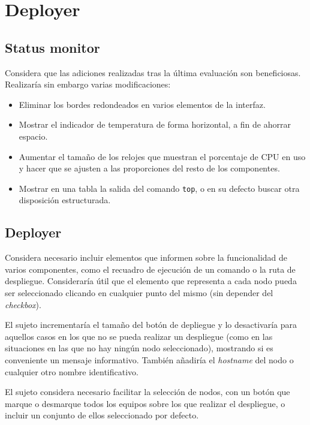 \section{Deployer}

\subsection{Status monitor}

Considera que las adiciones realizadas tras la última evaluación son beneficiosas. Realizaría sin embargo varias modificaciones:

\begin{itemize}
	\item Eliminar los bordes redondeados en varios elementos de la interfaz.
	\item Mostrar el indicador de temperatura de forma horizontal, a fin de ahorrar espacio.
	\item Aumentar el tamaño de los relojes que muestran el porcentaje de CPU en uso y hacer que se ajusten a las proporciones del resto de los componentes.
	\item Mostrar en una tabla la salida del comando \texttt{top}, o en su defecto buscar otra disposición estructurada.
\end{itemize}


\subsection{Deployer}

Considera necesario incluir elementos que informen sobre la funcionalidad de varios componentes, como el recuadro de ejecución de un comando o la ruta de despliegue. Consideraría útil que el elemento que representa a cada nodo pueda ser seleccionado clicando en cualquier punto del mismo (sin depender del \textit{checkbox}).

El sujeto incrementaría el tamaño del botón de depliegue y lo desactivaría para aquellos casos en los que no se pueda realizar un despliegue (como en las situaciones en las que no hay ningún nodo seleccionado), mostrando si es conveniente un mensaje informativo. También añadiría el \textit{hostname} del nodo o cualquier otro nombre identificativo.

El sujeto considera necesario facilitar la selección de nodos, con un botón que marque o desmarque todos los equipos sobre los que realizar el despliegue, o incluir un conjunto de ellos seleccionado por defecto.

